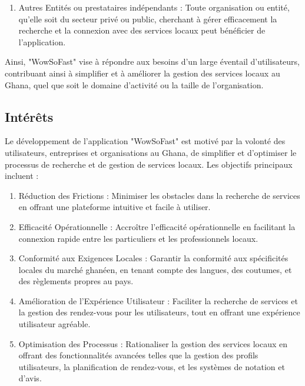 {\begin{enumerate}
    \item Autres Entités ou prestataires indépendants : Toute organisation ou entité, qu'elle soit du secteur privé ou public, cherchant à gérer efficacement la recherche et la connexion avec des services locaux peut bénéficier de l'application.
    
\end{enumerate}

Ainsi, "WowSoFast" vise à répondre aux besoins d'un large éventail d'utilisateurs, contribuant ainsi à simplifier et à améliorer la gestion des services locaux au Ghana, quel que soit le domaine d'activité ou la taille de l'organisation.


\subsection{Intérêts}

Le développement de l'application "WowSoFast" est motivé par la volonté des utilisateurs, entreprises et organisations au Ghana, de simplifier et d'optimiser le processus de recherche et de gestion de services locaux. Les objectifs principaux incluent :

\begin{enumerate}
    \item Réduction des Frictions : Minimiser les obstacles dans la recherche de services en offrant une plateforme intuitive et facile à utiliser.

    \item Efficacité Opérationnelle : Accroître l'efficacité opérationnelle en facilitant la connexion rapide entre les particuliers et les professionnels locaux.

    \item Conformité aux Exigences Locales : Garantir la conformité aux spécificités locales du marché ghanéen, en tenant compte des langues, des coutumes, et des règlements propres au pays.

    \item Amélioration de l'Expérience Utilisateur : Faciliter la recherche de services et la gestion des rendez-vous pour les utilisateurs, tout en offrant une expérience utilisateur agréable.

    \item Optimisation des Processus : Rationaliser la gestion des services locaux en offrant des fonctionnalités avancées telles que la gestion des profils utilisateurs, la planification de rendez-vous, et les systèmes de notation et d'avis.


\end{enumerate}}
